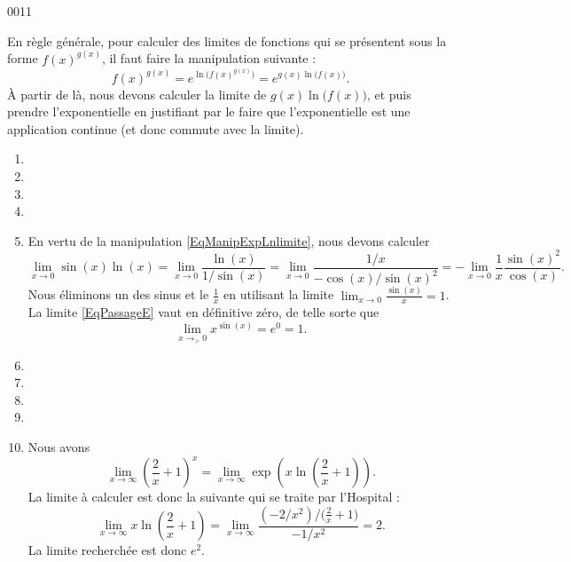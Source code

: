\begin{corrige}{0011}

En règle générale, pour calculer des limites de fonctions qui se présentent sous la forme $f(x)^{g(x)}$, il faut faire la manipulation suivante :
\begin{equation}	\label{EqManipExpLnlimite}
	f(x)^{g(x)}= e^{\ln\big( f(x)^{g(x)} \big)}= e^{g(x)\ln\big( f(x) \big)}.
\end{equation}
À partir de là, nous devons calculer la limite de $g(x)\ln\big( f(x) \big)$, et puis prendre l'exponentielle en justifiant par le faire que l'exponentielle est une application continue (et donc commute avec la limite).

\begin{enumerate}

\item
\item
\item
\item
\item
En vertu de la manipulation \eqref{EqManipExpLnlimite}, nous devons calculer
\begin{equation}		\label{EqPassageE}
	\lim_{x\to 0} \sin(x)\ln(x)=\lim_{x\to 0} \frac{ \ln(x) }{ 1/\sin(x) }=\lim_{x\to 0} \frac{ 1/x }{ -\cos(x)/\sin(x)^2 }=-\lim_{x\to 0} \frac{1}{ x }\frac{ \sin(x)^2 }{ \cos(x) }.
\end{equation}
Nous éliminons un des sinus et le $\frac{1}{ x }$ en utilisant la limite $\lim_{x\to 0} \frac{ \sin(x) }{ x }=1$. La limite \eqref{EqPassageE} vaut en définitive zéro, de telle sorte que
\begin{equation}
	\lim_{x\to_> 0} x^{\sin(x)}= e^{0}=1.
\end{equation}

\item
\item
\item
\item
\item

Nous avons
\begin{equation}
	\lim_{x\to \infty} \left( \frac{ 2 }{ x }+1 \right)^x=\lim_{x\to \infty} \exp\left( x\ln(\frac{ 2 }{ x }+1) \right).
\end{equation}
La limite à calculer est donc la suivante qui se traite par l'Hospital :
\begin{equation}
	\lim_{x\to \infty} x\ln\left( \frac{ 2 }{ x }+1 \right)=\lim_{x\to \infty} \frac{  (-2/x^2)/\big( \frac{ 2 }{ x }+1 \big)     }{ -1/x^2 }=2.
\end{equation}
La limite recherchée est donc $e^2$.


\end{enumerate}
\end{corrige}
